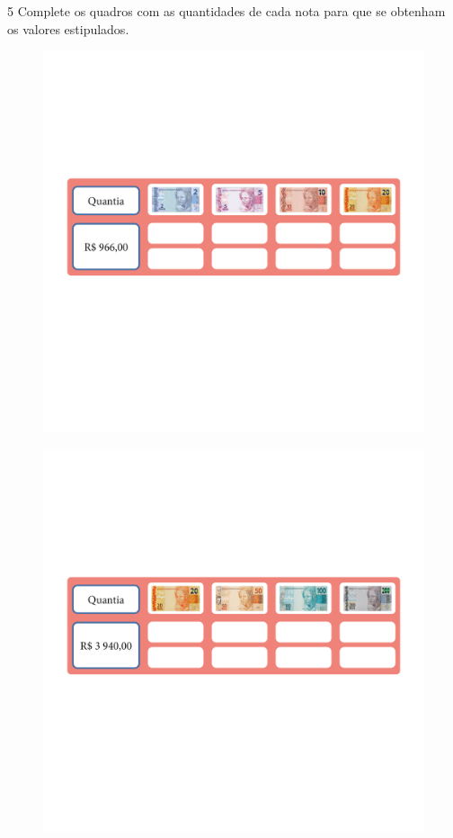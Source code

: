 \num{5} Complete os quadros com as quantidades de cada nota para que se obtenham os valores estipulados.

\begin{figure}[htpb!]
\includegraphics[width=\textwidth]{../ilustracoes/MAT5/SAEB_5ANO_MAT_figura51.png}
\end{figure}

\begin{figure}[htpb!]
\includegraphics[width=\textwidth]{../ilustracoes/MAT5/SAEB_5ANO_MAT_figura52.png}
\end{figure}

